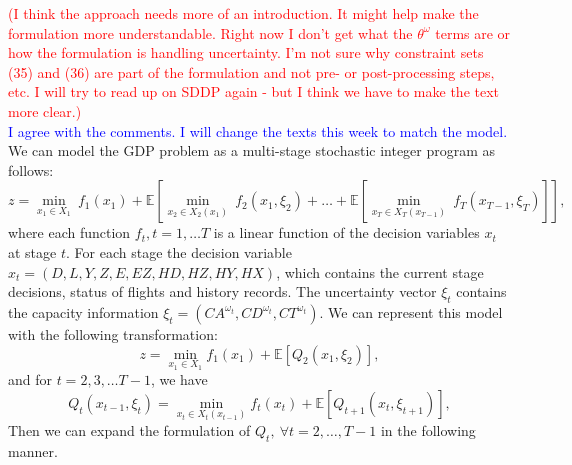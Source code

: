 \documentclass[12pt]{article}
\begin{document}
	\newline
	\textcolor{red}{(I think the approach needs more of an introduction.  It might help make the formulation more understandable.  Right now I don't get what the $\theta^\omega$ terms are or how the formulation is handling uncertainty.  I'm not sure why constraint sets (35) and (36) are part of the formulation and not pre- or post-processing steps, etc.  I will try to read up on SDDP again - but I think we have to make the text more clear.)}\\
	\newline
	\textcolor{blue}{I agree with the comments. I will change the texts this week to match the model.} We can model the GDP problem as a multi-stage stochastic integer program as follows: 
	\begin{equation}
		z = \min_{x_1 \in X_1} \  f_1(x_1) + \mathbb{E} \left[ \min_{x_2 \in X_2(x_1)} \ f_2(x_1, \xi_2) + \dots + \mathbb{E} \left[ \min_{x_T \in X_T(x_{T-1})} \ f_T(x_{T-1}, \xi_T)\right] \right],
	\end{equation}
	where each function \(f_t, t = 1, \dots T\) is a linear function of the decision variables \(x_t\) at stage \(t\). For each stage the decision variable \(x_t = (D,L,Y,Z,E,EZ,HD,HZ,HY,HX)\), which contains the current stage decisions, status of flights and history records. The uncertainty vector \(\xi_t\) contains the capacity information \(\xi_t = (CA^{\omega_t}, CD^{\omega_t}, CT^{\omega_t})\). We can represent this model with the following transformation:
	\begin{equation}
		z = \min_{x_1 \in X_1} f_1(x_1) + \mathbb{E}\left[ Q_2(x_1, \xi_2)\right],
	\end{equation}
	and for \(t = 2, 3, \dots T - 1\), we have 
	\begin{equation}
		Q_t(x_{t-1},\xi_t) = \min_{x_t \in X_{t}(x_{t-1})}f_t(x_t) + \mathbb{E} \left[ Q_{t+1}(x_t, \xi_{t+1})\right],
	\end{equation}
	Then we can expand the formulation of \(Q_t,\ \forall t = 2, \dots, T-1\) in the following manner.
\end{document}
